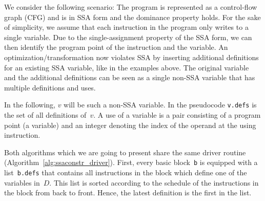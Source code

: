 We consider the following scenario:
The program is represented as a control-flow graph (CFG) and is in SSA form and the dominance property holds.
For the sake of simplicity, we assume that each instruction in the program only writes to a single variable.
Due to the single-assignment property of the SSA form, we can then identify the program point of the instruction and the variable. 
An optimization/transformation now violates SSA by inserting additional definitions for an existing SSA variable, like in the examples above.
The original variable and the additional definitions can be seen as a single non-SSA variable that has multiple definitions and uses.

In the following, $v$ will be such a non-SSA variable.
In the pseudocode \verb|v.defs| is the set of all definitions of~$v$.
A use of a variable is a pair consisting of a program point (a variable) and an integer denoting the index of the operand at the using instruction.

Both algorithms which we are going to present share the same driver routine (Algorithm~\ref{alg:ssaconstr_driver}).
First, every basic block~\verb|b| is equipped with a list~\verb|b.defs| that contains all instructions in the block which define one of the variables in~$D$.
This list is sorted according to the schedule of the instructions in the block from back to front.
Hence, the latest definition is the first in the list.

